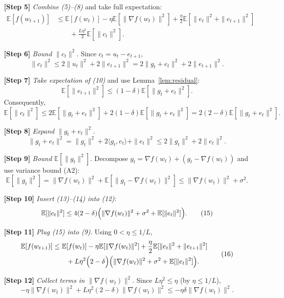\documentclass{article}
\newcommand{\E}{\mathbb{E}}
\newcommand{\inner}[2]{\langle #1,#2\rangle}
\begin{document}
\noindent\textbf{[Step 5]} \emph{Combine (5)–(8)} and take full expectation:
\[
\begin{aligned}
\E[f(w_{t+1})]
&\le \E[f(w_{t})]
-\eta\E\!\left[\|\nabla f(w_{t})\|^{2}\right]
+\frac{\eta}{2}\E\!\left[\|e_{t}\|^{2}+\|e_{t+1}\|^{2}\right]  \\
&\qquad+\frac{L\eta^{2}}{2}\E\!\left[\|c_{t}\|^{2}\right].
\end{aligned}
\tag{9}
\]

\noindent\textbf{[Step 6]} \emph{Bound $\|c_{t}\|^{2}$}.  
Since $c_{t}=u_{t}-e_{t+1}$,
\[
\|c_{t}\|^{2}\le 2\|u_{t}\|^{2}+2\|e_{t+1}\|^{2}
=2\|g_{t}+e_{t}\|^{2}+2\|e_{t+1}\|^{2}.
\tag{10}
\]

\noindent\textbf{[Step 7]} \emph{Take expectation of (10)} and use Lemma~\ref{lem:residual}:
\[
\E[\|e_{t+1}\|^{2}]
\le (1-\delta)\E[\|g_{t}+e_{t}\|^{2}].
\tag{11}
\]
Consequently,
\[
\E[\|c_{t}\|^{2}]
\le 2\E[\|g_{t}+e_{t}\|^{2}]
+2(1-\delta)\E[\|g_{t}+e_{t}\|^{2}]
=2(2-\delta)\E[\|g_{t}+e_{t}\|^{2}].
\tag{12}
\]

\noindent\textbf{[Step 8]} \emph{Expand $\|g_{t}+e_{t}\|^{2}$}.  
\[
\|g_{t}+e_{t}\|^{2}
= \|g_{t}\|^{2}+2\inner{g_{t}}{e_{t}}+\|e_{t}\|^{2}
\le 2\|g_{t}\|^{2}+2\|e_{t}\|^{2}.
\tag{13}
\]

\noindent\textbf{[Step 9]} \emph{Bound $\E[\|g_{t}\|^{2}]$}.  
Decompose $g_{t}=\nabla f(w_{t})+(g_{t}-\nabla f(w_{t}))$ and use variance bound (A2):
\[
\E[\|g_{t}\|^{2}]
= \|\nabla f(w_{t})\|^{2}+\E[\|g_{t}-\nabla f(w_{t})\|^{2}]
\le \|\nabla f(w_{t})\|^{2}+\sigma^{2}.
\tag{14}
\]

\noindent\textbf{[Step 10]} \emph{Insert (13)–(14) into (12)}:
\[
\E[\|c_{t}\|^{2}]
\le 4(2-\delta)\Bigl(\|\nabla f(w_{t})\|^{2}+\sigma^{2}+\E[\|e_{t}\|^{2}]\Bigr).
\tag{15}
\]

\noindent\textbf{[Step 11]} \emph{Plug (15) into (9)}.  Using $0<\eta\le 1/L$,
\[
\begin{aligned}
\E[f(w_{t+1})]
&\le \E[f(w_{t})]
-\eta\E[\|\nabla f(w_{t})\|^{2}]
+\frac{\eta}{2}\E[\|e_{t}\|^{2}+\|e_{t+1}\|^{2}]\\
&\qquad+L\eta^{2}\Bigl(2-\delta\Bigr)\Bigl(\|\nabla f(w_{t})\|^{2}+\sigma^{2}+\E[\|e_{t}\|^{2}]\Bigr).
\end{aligned}
\tag{16}
\]

\noindent\textbf{[Step 12]} \emph{Collect terms in $\|\nabla f(w_{t})\|^{2}$}.  
Since $L\eta^{2}\le\eta$ (by $\eta\le 1/L$),
\[
-\eta\|\nabla f(w_{t})\|^{2}+L\eta^{2}(2-\delta)\|\nabla f(w_{t})\|^{2}
\le -\eta\delta\|\nabla f(w_{t})\|^{2}.
\tag{17}
\]
\end{document}
